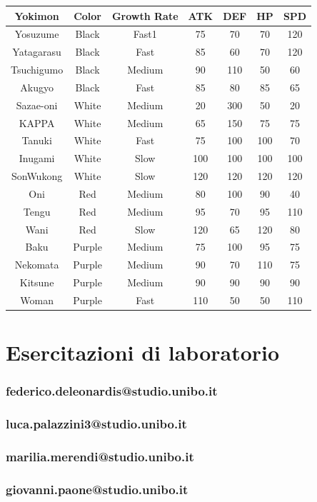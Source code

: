 \documentclass[a4paper,12pt]{report}
\begin{document}
\begin{tabular}{ |c|c|c|c|c|c|c| } 
     \hline
     \textbf{Yokimon} & \textbf{Color} & \textbf{Growth Rate} & \textbf{ATK} & \textbf{DEF} & \textbf{HP} & \textbf{SPD} \\ 
     \hline
     \hline
     Yosuzume & Black & Fast1 & 75 & 70 & 70 & 120 \\ 
     \hline
     Yatagarasu & Black & Fast & 85 & 60 & 70 & 120 \\ 
     \hline
     Tsuchigumo & Black & Medium & 90 & 110 & 50 & 60 \\ 
     \hline
     Akugyo & Black & Fast & 85 & 80 & 85 & 65 \\ 
     \hline
     Sazae-oni & White & Medium & 20 & 300 & 50 & 20 \\ 
     \hline
     KAPPA & White & Medium & 65 & 150 & 75 & 75 \\ 
     \hline
     Tanuki & White & Fast & 75 & 100 & 100 & 70 \\ 
     \hline
     Inugami & White & Slow & 100 & 100 & 100 & 100 \\ 
     \hline
     SonWukong & White & Slow & 120 & 120 & 120 & 120 \\ 
     \hline
     Oni & Red & Medium & 80 & 100 & 90 & 40 \\ 
     \hline
     Tengu & Red & Medium & 95 & 70 & 95 & 110 \\ 
     \hline
     Wani & Red & Slow & 120 & 65 & 120 & 80 \\ 
     \hline
     Baku & Purple & Medium & 75 & 100 & 95 & 75 \\ 
     \hline
     Nekomata & Purple & Medium & 90 & 70 & 110 & 75 \\ 
     \hline
     Kitsune & Purple & Medium & 90 & 90 & 90 & 90 \\ 
     \hline
     Woman & Purple & Fast & 110 & 50 & 50 & 110 \\ 
     \hline
\end{tabular}
\normalsize
\chapter{Esercitazioni di laboratorio}
\subsection{federico.deleonardis@studio.unibo.it}
\subsection{luca.palazzini3@studio.unibo.it}
\subsection{marilia.merendi@studio.unibo.it}
\subsection{giovanni.paone@studio.unibo.it}


\end{document}
